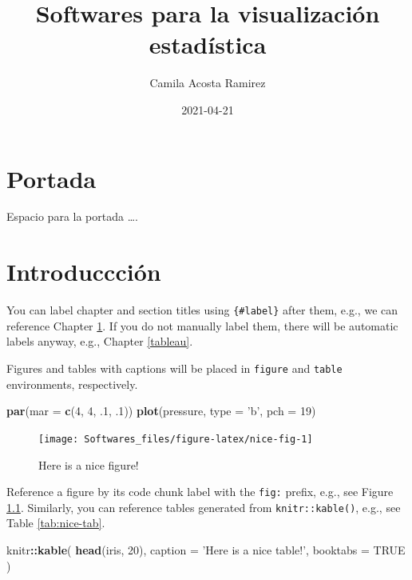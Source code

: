 \documentclass[
]{book}
\title{Softwares para la visualización estadística}
\author{Camila Acosta Ramirez}
\date{2021-04-21}
\newenvironment{Shaded}{\begin{snugshade}}{\end{snugshade}}
\newcommand{\DataTypeTok}[1]{\textcolor[rgb]{0.13,0.29,0.53}{#1}}
\newcommand{\DecValTok}[1]{\textcolor[rgb]{0.00,0.00,0.81}{#1}}
\newcommand{\FloatTok}[1]{\textcolor[rgb]{0.00,0.00,0.81}{#1}}
\newcommand{\KeywordTok}[1]{\textcolor[rgb]{0.13,0.29,0.53}{\textbf{#1}}}
\newcommand{\NormalTok}[1]{#1}
\newcommand{\OperatorTok}[1]{\textcolor[rgb]{0.81,0.36,0.00}{\textbf{#1}}}
\newcommand{\OtherTok}[1]{\textcolor[rgb]{0.56,0.35,0.01}{#1}}
\newcommand{\StringTok}[1]{\textcolor[rgb]{0.31,0.60,0.02}{#1}}
\begin{document}
\maketitle

{
\setcounter{tocdepth}{1}
\tableofcontents
}
\hypertarget{portada}{%
\chapter*{Portada}\label{portada}}

Espacio para la portada \ldots.

\hypertarget{intro}{%
\chapter{Introduccción}\label{intro}}

You can label chapter and section titles using \texttt{\{\#label\}} after them, e.g., we can reference Chapter \ref{intro}. If you do not manually label them, there will be automatic labels anyway, e.g., Chapter \ref{tableau}.

Figures and tables with captions will be placed in \texttt{figure} and \texttt{table} environments, respectively.

\begin{Shaded}
\begin{Highlighting}[]
\KeywordTok{par}\NormalTok{(}\DataTypeTok{mar =} \KeywordTok{c}\NormalTok{(}\DecValTok{4}\NormalTok{, }\DecValTok{4}\NormalTok{, }\FloatTok{.1}\NormalTok{, }\FloatTok{.1}\NormalTok{))}
\KeywordTok{plot}\NormalTok{(pressure, }\DataTypeTok{type =} \StringTok{'b'}\NormalTok{, }\DataTypeTok{pch =} \DecValTok{19}\NormalTok{)}
\end{Highlighting}
\end{Shaded}

\begin{figure}

{\centering \texttt{[image: Softwares\_files/figure-latex/nice-fig-1]} 

}

\caption{Here is a nice figure!}\label{fig:nice-fig}
\end{figure}

Reference a figure by its code chunk label with the \texttt{fig:} prefix, e.g., see Figure \ref{fig:nice-fig}. Similarly, you can reference tables generated from \texttt{knitr::kable()}, e.g., see Table \ref{tab:nice-tab}.

\begin{Shaded}
\begin{Highlighting}[]
\NormalTok{knitr}\OperatorTok{::}\KeywordTok{kable}\NormalTok{(}
  \KeywordTok{head}\NormalTok{(iris, }\DecValTok{20}\NormalTok{), }\DataTypeTok{caption =} \StringTok{'Here is a nice table!'}\NormalTok{,}
  \DataTypeTok{booktabs =} \OtherTok{TRUE}
\NormalTok{)}
\end{Highlighting}
\end{Shaded}
\end{document}
